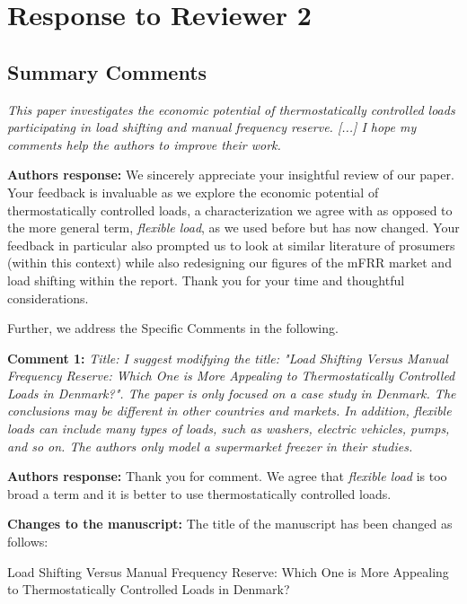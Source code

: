 \documentclass[10pt]{article}
\newcommand{\nt}[1]{\textcolor{newtextcolor}{#1}}
\newcommand{\auth}{\textbf{Authors response: }}
\newcommand{\changes}{\textbf{Changes to the manuscript: }}
\begin{document}



\newpage
\section{Response to Reviewer 2}

\subsection{Summary Comments} \label{rl_sec:rev2_summary_comms}

\textit{This paper investigates the economic potential of thermostatically controlled loads participating in load shifting and manual frequency reserve. [...] I hope my comments help the authors to improve their work. }

\auth We sincerely appreciate your insightful review of our paper. Your feedback is invaluable as we explore the economic potential of thermostatically controlled loads, a characterization we agree with as opposed to the more general term, \textit{flexible load}, as we used before but has now changed. Your feedback in particular also prompted us to look at similar literature of prosumers (within this context) while also redesigning our figures of the mFRR market and load shifting within the report. Thank you for your time and thoughtful considerations.

Further, we address the Specific Comments in the following.

\textbf{Comment 1:} \textit{Title: I suggest modifying the title: "Load Shifting Versus Manual Frequency Reserve: Which One is More Appealing to Thermostatically Controlled Loads in Denmark?". The paper is only focused on a case study in Denmark. The conclusions may be different in other countries and markets. In addition, flexible loads can include many types of loads, such as washers, electric vehicles, pumps, and so on. The authors only model a supermarket freezer in their studies.}

\auth Thank you for comment. We agree that \textit{flexible load} is too broad a term and it is better to use thermostatically controlled loads.

\changes The title of the manuscript has been changed as follows:

\nt{Load Shifting Versus Manual Frequency Reserve:  Which One is More Appealing to Thermostatically Controlled Loads in Denmark?}
\end{document}
